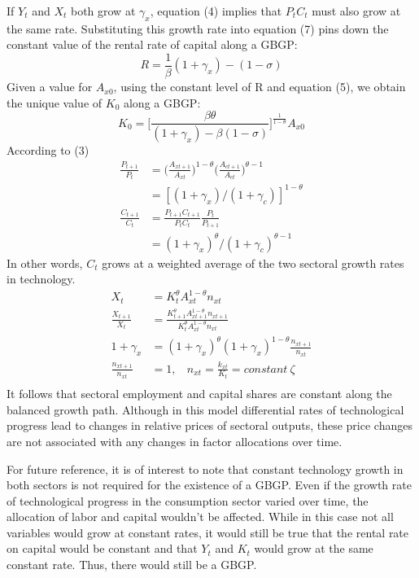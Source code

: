 \documentclass{article}
\begin{document}
    If $Y_t$ and $X_t$ both grow at $\gamma_x$, equation (4) implies that $P_tC_t$ must also grow at the same rate. Substituting this growth rate into equation (7) pins down the constant value of the rental rate of capital along a GBGP:
    \begin{equation*}
        R=\frac{1}{\beta}(1+\gamma_x)-(1-\sigma)
    \end{equation*}
    Given a value for $A_{x0}$, using the constant level of R and equation (5), we obtain the unique value of $K_0$ along a GBGP:
    \begin{equation}
        K_0=\biggl[ \frac{\beta \theta}{(1+\gamma_x)-\beta(1-\sigma)} \biggr]^{\frac{1}{1-\theta}} A_{x0}
    \end{equation}
    According to (3)
    \begin{align*}
        \frac{P_{t+1}}{P_t}&=\biggl( \frac{A_{xt+1}}{A_{xt}} \biggr)^{1-\theta} \biggl( \frac{A_{ct+1}}{A_{ct}} \biggr)^{\theta-1}\\
        &=[(1+\gamma_x)/(1+\gamma_c)]^{1-\theta}\\
        \frac{C_{t+1}}{C_t}&=\frac{P_{t+1}C_{t+1}}{P_tC_t} \frac{P_t}{P_{t+1}}\\
        &=(1+\gamma_x)^\theta /(1+\gamma_c)^{\theta-1}
    \end{align*}
    In other words, $C_t$ grows at a weighted average of the two sectoral growth rates in technology.
    \begin{align*}
        X_t&=K_t^\theta A_{xt}^{1-\theta} n_{xt}\\
        \frac{X_{t+1}}{X_t}&=\frac{K_{t+1}^\theta A_{xt+1}^{1-\theta} n_{xt+1}}{K_t^\theta A_{xt}^{1-\theta} n_{xt}}\\
        1+\gamma_x&=(1+\gamma_x)^{\theta} (1+\gamma_x)^{1-\theta} \frac{n_{xt+1}}{n_{xt}}\\
        \frac{n_{xt+1}}{n_{xt}}&=1,\ \ \ \ n_{xt}=\frac{k_{xt}}{K_t}=constant\ \zeta\\
    \end{align*}
    It follows that sectoral employment and capital shares are constant along the balanced growth path. Although in this model differential rates of technological progress lead to changes in relative prices of sectoral outputs, these price changes are not associated with any changes in factor allocations over time.

    For future reference, it is of interest to note that constant technology growth in both sectors is not required for the existence of a GBGP. Even if the growth rate of technological progress in the consumption sector varied over time, the allocation of labor and capital wouldn't be affected. While in this case not all variables would grow at constant rates, it would still be true that the rental rate on capital would be constant and that $Y_t$ and $K_t$ would grow at the same constant rate. Thus, there would still be a GBGP.
    
\end{document}
